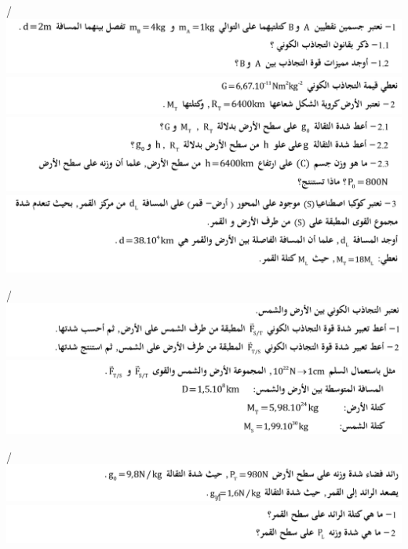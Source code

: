 \documentclass[12pt,a4paper]{article}
\begin{document}
\begin{exercice}{}/
					\includegraphics[width=\linewidth]{images/Tc/p1/e12_1.png}
					\includegraphics[width=\linewidth]{images/Tc/p1/e12_2.png}
					\includegraphics[width=\linewidth]{images/Tc/p1/e12_3.png}
					\includegraphics[width=\linewidth]{images/Tc/p1/e12_4.png}
					\end{exercice}%
\begin{exercice}{}/
					\includegraphics[width=\linewidth]{images/Tc/p1/e13_1.png}
					\includegraphics[width=\linewidth]{images/Tc/p1/e13_2.png}
					\end{exercice}%
\begin{exercice}{}/
					\includegraphics[width=\linewidth]{images/Tc/p1/e14_1.png}
					\includegraphics[width=\linewidth]{images/Tc/p1/e14_2.png}
					\end{exercice}%
\end{document}
